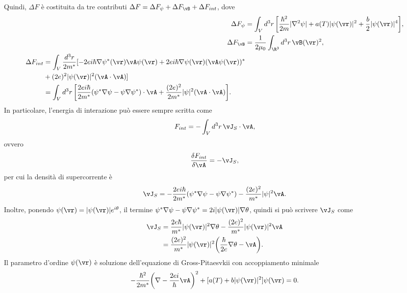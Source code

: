 Quindi, $\Delta F$ è costituita da tre contributi $\Delta F = \Delta F_\psi + \Delta F_{\vB} + \Delta F_{int}$, dove 
\begin{align}
    \Delta F_\psi &= \int_V d^3r\,\bigg[\frac{\hbar^2}{2m}|\nabla^2\psi| + a(T)|\psi(\vr)|^2 + \frac{b}{2}|\psi(\vr)|^4\bigg], \\
    \Delta F_{\vB} &= \frac{1}{2\mu_0}\int_{\R^3} d^3r\,\vB(\vr)^2, \\
    \begin{split}
        \Delta F_{int} &= \int_V\frac{d^3r}{2m^*}[-2ei\hbar\nabla\psi^*(\vr)\vA\psi(\vr) + 2ei\hbar\nabla\psi(\vr)(\vA\psi(\vr))^* \\
        &+ (2e)^2|\psi(\vr)|^2(\vA \cdot \vA)] \\
        &= \int_V d^3r\,\bigg[\frac{2ei\hbar}{2m^*}(\psi^*\nabla\psi - \psi\nabla\psi^*)\cdot\vA + \frac{(2e)^2}{2m^*}|\psi|^2(\vA\cdot\vA)\bigg].
    \end{split}
\end{align}
In particolare, l'energia di interazione può essere sempre scritta come
\begin{equation}
    F_{int} = -\int_Vd^3r\,\vJ_S\cdot\vA,
\end{equation}
ovvero
\begin{equation}
    \frac{\delta F_{int}}{\delta \vA} = -\vJ_S,
\end{equation}
per cui la densità di supercorrente è
\begin{equation}
    \vJ_S = -\frac{2ei\hbar}{2m^*}(\psi^*\nabla\psi - \psi\nabla\psi^*) - \frac{(2e)^2}{m^*}|\psi|^2\vA.
\end{equation}
Inoltre, ponendo $\psi(\vr) = |\psi(\vr)|e^{i\theta}$, il termine $\psi^*\nabla\psi - \psi\nabla\psi^* = 2i|\psi(\vr)|\nabla\theta$, quindi si può scrivere $\vJ_S$ come
\begin{equation}
    \begin{split}
        \vJ_S &= \frac{2e\hbar}{m^*}|\psi(\vr)|^2\nabla\theta - \frac{(2e)^2}{m^*}|\psi(\vr)|^2\vA \\
        &= \frac{(2e)^2}{m^*}|\psi(\vr)|^2\bigg(\frac{\hbar}{2e}\nabla\theta - \vA\bigg).
    \end{split}
\end{equation}
Il parametro d'ordine $\psi(\vr)$ è soluzione dell'equazione di Gross-Pitaesvkii con accoppiamento minimale
\begin{equation}
    -\frac{\hbar^2}{2m^*}\bigg(\nabla - \frac{2ei}{\hbar}\vA\bigg)^2 + [a(T) + b|\psi(\vr)|^2]\psi(\vr) = 0.
\end{equation}

